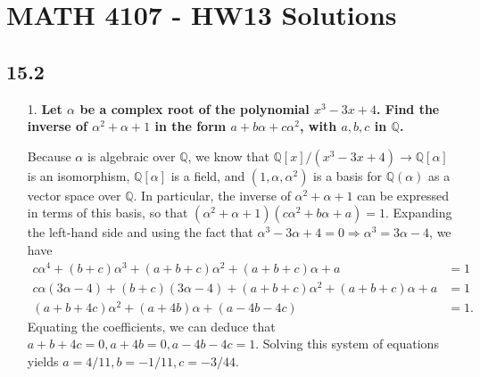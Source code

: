 \documentclass[a4paper,12pt]{article}
\begin{document}
\section*{MATH 4107 - HW13 Solutions}

\subsection*{15.2}
\begin{enumerate}
    \item[1.]
        \boldmath
        \textbf{Let $\alpha$ be a complex root of the polynomial $x^3 - 3x + 4$. Find the inverse of $\alpha^2 + \alpha + 1$ in the form $a + b\alpha + c\alpha^2$, with $a, b, c$ in $\mathbb{Q}$.} \par
        \unboldmath
        Because $\alpha$ is algebraic over $\mathbb{Q}$, we know that $\mathbb{Q}[x]/(x^3 - 3x + 4) \to \mathbb{Q}[\alpha]$ is an isomorphism, $\mathbb{Q}[\alpha]$ is a field, and $(1, \alpha, \alpha^2)$ is a basis for $\mathbb{Q}(\alpha)$ as a vector space over $\mathbb{Q}$. In particular, the inverse of $\alpha^2 + \alpha + 1$ can be expressed in terms of this basis, so that $(\alpha^2 + \alpha + 1)(c\alpha^2 + b\alpha + a) = 1$. Expanding the left-hand side and using the fact that $\alpha^3 - 3\alpha + 4 = 0 \Rightarrow \alpha^3 = 3\alpha - 4$, we have
        \begin{align*}
            c\alpha^4 + (b + c)\alpha^3 + (a + b + c)\alpha^2 + (a + b + c)\alpha + a &= 1\\
            c\alpha(3\alpha - 4) + (b + c)(3\alpha - 4) + (a + b + c)\alpha^2 + (a + b + c)\alpha + a &= 1 \\
            (a + b + 4c)\alpha^2 + (a + 4b)\alpha + (a - 4b - 4c) &= 1.
        \end{align*}
        Equating the coefficients, we can deduce that $a + b + 4c = 0, a + 4b = 0, a - 4b - 4c = 1$. Solving this system of equations yields $a = 4/11, b = -1/11, c = -3/44$.


\end{enumerate}
\end{document}
